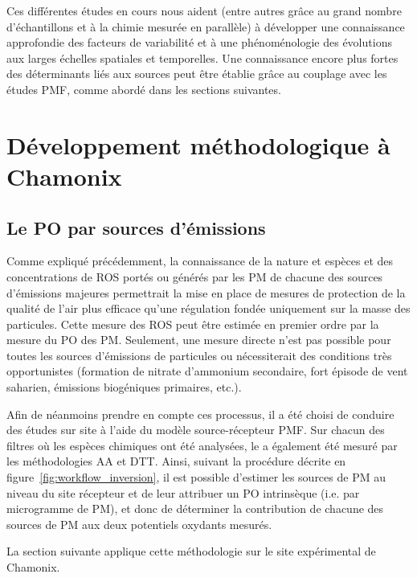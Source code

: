 Ces différentes études en cours nous aident (entre autres grâce au grand nombre
d'échantillons et à la chimie mesurée en parallèle) à développer une connaissance
approfondie des facteurs de variabilité et à une phénoménologie des évolutions aux larges
échelles spatiales et temporelles. Une connaissance encore plus fortes des déterminants
liés aux sources peut être établie grâce au couplage avec les études PMF, comme abordé
dans les sections suivantes.

\clearpage
\section{Développement méthodologique à Chamonix}%
\label{ssub:développement_méthodologique_à_chamonix}

\subsection{Le PO par sources d'émissions}%
\label{sub:le_po_par_sources_d_émission}

Comme expliqué précédemment, la connaissance de la nature et espèces et des concentrations
de ROS portés ou générés par les PM de chacune des sources d'émissions majeures
permettrait la mise en place de mesures de protection de la qualité de l'air plus efficace
qu'une régulation fondée uniquement sur la masse des particules.  Cette mesure des ROS
peut être estimée en premier ordre par la mesure du PO des PM.  Seulement, une mesure
directe n'est pas possible pour toutes les sources d'émissions de particules ou
nécessiterait des conditions très opportunistes (formation de nitrate d'ammonium
secondaire, fort épisode de vent saharien, émissions biogéniques primaires, etc.).

Afin de néanmoins prendre en compte ces processus, il a été choisi de conduire des études
sur site à l'aide du modèle source-récepteur PMF. Sur chacun des filtres où les espèces
chimiques ont été analysées, le \POv{} a également été mesuré par les méthodologies AA et DTT. Ainsi, suivant
la procédure décrite en figure~\ref{fig:workflow_inversion}, il est possible d'estimer les
sources de PM au niveau du site récepteur et de leur attribuer un PO intrinsèque (i.e. par
microgramme de PM), et donc de déterminer la contribution de chacune des sources de PM aux
deux potentiels oxydants mesurés.

La section suivante applique cette méthodologie sur le site expérimental de Chamonix.



